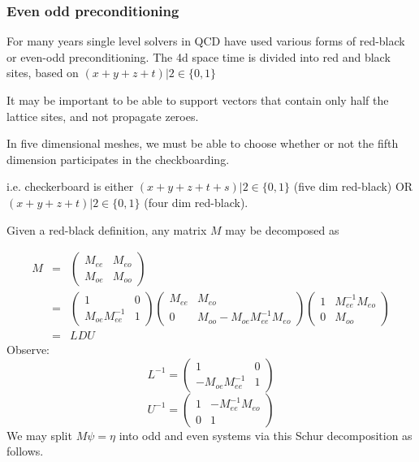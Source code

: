 \documentclass[letter,10pt]{report}
\begin{document}
\subsubsection{Even odd preconditioning}

For many years single level solvers in QCD have used various forms of red-black or even-odd preconditioning.
The 4d space time is divided into red and black sites, based on $(x+y+z+t)|2 \in \{ 0,1 \}$

It may be important to be able to support vectors that contain only half the lattice sites, and not propagate zeroes.

In five dimensional meshes, we must be able to choose whether or not the fifth dimension participates in the checkboarding.

i.e. checkerboard is either
$(x+y+z+t+s)|2 \in \{ 0,1 \}$ (five dim red-black)
OR
$(x+y+z+t)|2 \in \{ 0,1 \}$ (four dim red-black).

Given a red-black definition, any matrix $M$ may be decomposed as

\begin{eqnarray}
M &=&
\left(
\begin{array}{cc}
  M_{ee} &  M_{eo}\\
  M_{oe} &  M_{oo}
\end{array}
\right)\\
&=& 
\left(
\begin{array}{cc}
  1 & 0\\
  M_{oe} M_{ee}^{-1} &  1
\end{array}
\right)
\left(
\begin{array}{cc}
  M_{ee} &  M_{eo}\\
  0 &  M_{oo} - M_{oe} M_{ee}^{-1} M_{eo}
\end{array}
\right)
\left(
\begin{array}{cc}
  1 &  M_{ee}^{-1}  M_{eo}\\
  0 &  M_{oo}
\end{array}
\right)\\
&=& L D U
\end{eqnarray}
Observe:
$$
L^{-1} = \left(\begin{array}{cc}
    1&             0 \\
    -M_{oe}M_{ee}^{-1}  & 1
\end{array}
\right)
$$
$$
U^{-1}  = \left(\begin{array}{cc}
    1 &  -M_{ee}^{-1} M_{eo}\\
    0 &   1           
\end{array}
\right)
$$
We may split
$
M \psi = \eta
$
into odd and even systems via this Schur decomposition as follows.
\end{document}
